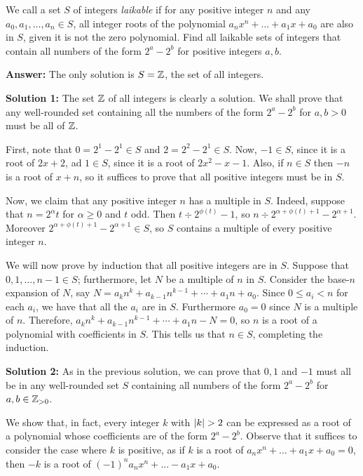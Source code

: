 We call a set $S$ of integers \textit{laikable} if for any positive integer $n$ and any $a_0,a_1,\ldots,a_n\in S$, all integer roots of the polynomial $a_nx^n+\ldots+a_1x+a_0$ are also in $S$, given it is not the zero polynomial. Find all laikable sets of integers that contain all numbers of the form $2^a-2^b$ for positive integers $a, b$.

\textbf{Answer:} The only solution is $S = \mathbb{Z}$, the set of all integers.

\textbf{Solution 1:} The set $\mathbb{Z}$ of all integers is clearly a solution. We shall prove that any well-rounded set containing all the numbers of the form $2^a -2^b$ for $a,b > 0$ must be all of $\mathbb{Z}$.

First, note that $0 = 2^1 - 2^1 \in S$ and $2 = 2^2 - 2^1 \in S$. Now, $-1\in S$, since it is a root of $2x+2$, ad $1\in S$, since it is a root of $2x^2-x-1$. Also, if $n\in S$ then $-n$ is a root of $x+n$, so it suffices to prove that all positive integers must be in $S$.

Now, we claim that any positive integer $n$ has a multiple in $S$. Indeed, suppose that $n = 2^{\alpha}t$ for $\alpha \geq 0$ and $t$ odd. Then $t\div 2^{\phi(t)}-1$, so $n\div 2^{\alpha + \phi(t)+1} - 2^{\alpha +1}$. Moreover $2^{\alpha + \phi(t)+1} - 2^{\alpha +1}\in S$, so $S$ contains a multiple of every positive integer $n$.

We will now prove by induction that all positive integers are in $S$. Suppose that $0,1, \ldots, n-1 \in S$; furthermore, let $N$ be a multiple of $n$ in $S$. Consider the base-$n$ expansion of $N$, say $N = a_kn^k+a_{k-1}n^{k-1}+\cdots+a_1n+a_0$. Since $0\leq a_i < n$ for each $a_i$, we have that all the $a_i$ are in $S$. Furthermore $a_0 = 0$ since $N$ is a multiple of $n$. Therefore, $a_kn^k+a_{k-1}n^{k-1}+\cdots+a_1n-N=0$, so $n$ is a root of a polynomial with coefficients in $S$. This tells us that $n\in S$, completing the induction.

\textbf{Solution 2:} As in the previous solution, we can prove that $0, 1$ and $-1$ must all be in any well-rounded set $S$ containing all numbers of the form $2^a-2^b$ for $a, b \in \mathbb{Z}_{>0}$. 

We show that, in fact, every integer $k$ with $\lvert k\rvert>2$ can be expressed as a root of a polynomial whose coefficients are of the form $2^a-2^b$. Observe that it suffices to consider the case where $k$ is positive, as if $k$ is a root of $a_nx^n + \ldots + a_1x+a_0=0$, then $-k$ is a root of $(-1)^na_nx^n + \ldots -a_1x+a_0$.

